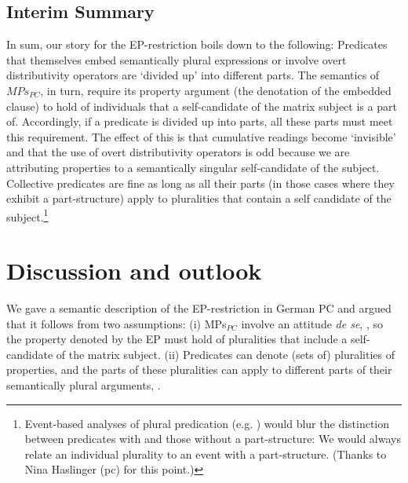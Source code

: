 \documentclass[output=paper,colorlinks,citecolor=brown,
]{langscibook}
\begin{document}
\subsection{Interim Summary}

In sum, our story for the EP-restriction boils down to the following: Predicates that themselves embed semantically plural expressions or involve overt distributivity operators are `divided up' into different parts. The semantics of $MPs_{PC}$, in turn, require its property argument (the denotation of the embedded clause) to hold of individuals that a self-candidate of the matrix subject is a part of. Accordingly, if a predicate is divided up into parts, all these parts must meet this requirement. The effect of this is that cumulative readings become `invisible' and that the use of overt distributivity operators is odd because we are attributing properties to a semantically singular self-candidate of the subject. Collective predicates are fine as long as all their parts (in those cases where they exhibit a part-structure) apply to pluralities that contain a self candidate of the subject.\footnote{Event-based analyses of plural predication (e.g. \citealt{Kratzer:2000}) would blur the distinction between predicates with and those without a part-structure: We would always relate an individual plurality to an event with a part-structure. (Thanks to Nina Haslinger (pc) for this point.)}



































\section{Discussion and outlook}\label{prinzhornsec:5}

We gave a semantic description of the EP-restriction in German PC and argued that it follows from two assumptions: (i) MPs$_{PC}$ involve an attitude \textit{de se}, \citep{Pearson:2016}, so the property denoted by the EP must hold of pluralities that include a self-candidate of the matrix subject. (ii) Predicates can denote (sets of) pluralities of properties, and the parts of these pluralities can apply to different parts of their semantically plural arguments, \citep{Haslinger:2018a,Haslinger:2018b}.
\end{document}
